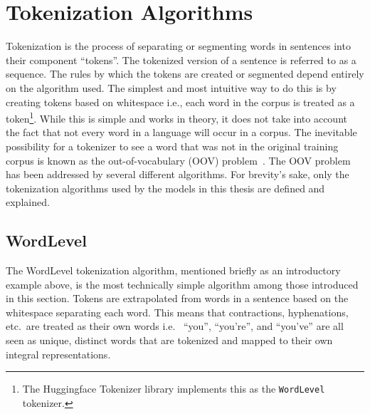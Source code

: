 \documentclass[12pt]{article}
\begin{document}


\section{Tokenization Algorithms}\label{sec:tokenizers}
Tokenization is the process of separating or segmenting words in sentences into their component ``tokens''. The tokenized version of a sentence is
referred to as a sequence. The rules by which the tokens are created or segmented depend entirely on the algorithm used. The simplest and most
intuitive way to do this is by creating tokens based on whitespace i.e., each word in the corpus is treated as a token\footnote{The Huggingface
    Tokenizer library implements this as the \lstinline|WordLevel| tokenizer.}. While this is simple and works in theory, it does not take into
account the fact that not every word in a language will occur in a corpus. The inevitable possibility for a tokenizer to see a word that was not in
the original training corpus is known as the out-of-vocabulary (OOV) problem~\cite{wu_googles_2016}. The OOV problem has been addressed by several
different algorithms. For brevity's sake, only the tokenization algorithms used by the models in this thesis are defined and explained.

\subsection{WordLevel}\label{sec:wordlevel}
The WordLevel \cite{wolf_transformers_2020} tokenization algorithm, mentioned briefly as an introductory example above, is the most technically simple
algorithm among those introduced in this section. Tokens are extrapolated from words in a sentence based on the whitespace separating each word.
This means that contractions, hyphenations, etc.~are treated as their own words i.e.~ ``you'', ``you're'', and ``you've'' are all seen as unique,
distinct words that are tokenized and mapped to their own integral representations.
\end{document}
